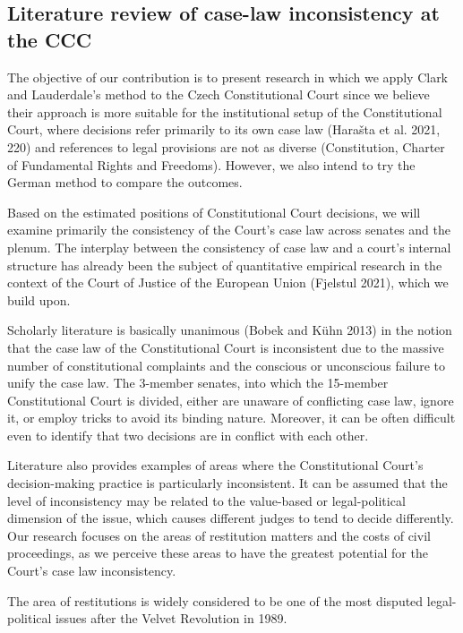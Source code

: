 \documentclass[
  11pt,
]{article}
\begin{document}
\hypertarget{literature-review-of-case-law-inconsistency-at-the-ccc}{%
\subsection{Literature review of case-law inconsistency at the
CCC}\label{literature-review-of-case-law-inconsistency-at-the-ccc}}

The objective of our contribution is to present research in which we
apply Clark and Lauderdale's method to the Czech Constitutional Court
since we believe their approach is more suitable for the institutional
setup of the Constitutional Court, where decisions refer primarily to
its own case law (Harašta et al. 2021, 220) and references to legal
provisions are not as diverse (Constitution, Charter of Fundamental
Rights and Freedoms). However, we also intend to try the German method
to compare the outcomes.

Based on the estimated positions of Constitutional Court decisions, we
will examine primarily the consistency of the Court's case law across
senates and the plenum. The interplay between the consistency of case
law and a court's internal structure has already been the subject of
quantitative empirical research in the context of the Court of Justice
of the European Union (Fjelstul 2021), which we build upon.

Scholarly literature is basically unanimous (Bobek and Kühn 2013) in the
notion that the case law of the Constitutional Court is inconsistent due
to the massive number of constitutional complaints and the conscious or
unconscious failure to unify the case law. The 3-member senates, into
which the 15-member Constitutional Court is divided, either are unaware
of conflicting case law, ignore it, or employ tricks to avoid its
binding nature. Moreover, it can be often difficult even to identify
that two decisions are in conflict with each other.

Literature also provides examples of areas where the Constitutional
Court's decision-making practice is particularly inconsistent. It can be
assumed that the level of inconsistency may be related to the
value-based or legal-political dimension of the issue, which causes
different judges to tend to decide differently. Our research focuses on
the areas of restitution matters and the costs of civil proceedings, as
we perceive these areas to have the greatest potential for the Court's
case law inconsistency.

The area of restitutions is widely considered to be one of the most
disputed legal-political issues after the Velvet Revolution in 1989.
\end{document}
